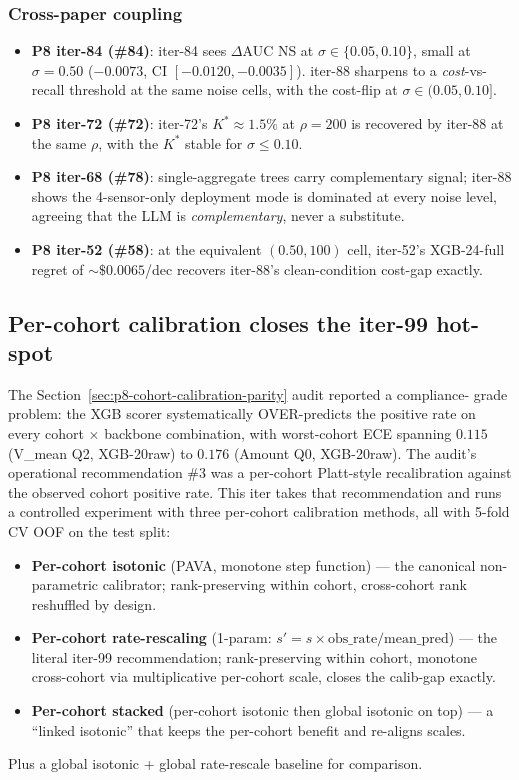 \documentclass{article}
\providecommand{\secref}[1]{Section~\ref{#1}}
\begin{document}
\subsubsection{Cross-paper coupling}
\begin{itemize}
\item \textbf{P8 iter-84 (\#84)}: iter-84 sees $\Delta$AUC NS at
      $\sigma \in \{0.05, 0.10\}$, small at $\sigma = 0.50$ ($-0.0073$,
      CI $[-0.0120, -0.0035]$). iter-88 sharpens to a
      \emph{cost}-vs-recall threshold at the same noise cells, with the
      cost-flip at $\sigma \in (0.05, 0.10]$.
\item \textbf{P8 iter-72 (\#72)}: iter-72's $K^* \approx 1.5\%$ at
      $\rho = 200$ is recovered by iter-88 at the same $\rho$, with the
      $K^*$ stable for $\sigma \le 0.10$.
\item \textbf{P8 iter-68 (\#78)}: single-aggregate trees carry
      complementary signal; iter-88 shows the 4-sensor-only deployment
      mode is dominated at every noise level, agreeing that the LLM is
      \emph{complementary}, never a substitute.
\item \textbf{P8 iter-52 (\#58)}: at the equivalent $(0.50, 100)$
      cell, iter-52's XGB-24-full regret of $\sim \$0.0065$/dec
      recovers iter-88's clean-condition cost-gap exactly.
\end{itemize}
 \subsection{Per-cohort calibration closes the iter-99 hot-spot}
\label{sec:p8-cohort-recalibration}

The \secref{sec:p8-cohort-calibration-parity} audit reported a compliance-
grade problem: the XGB scorer systematically OVER-predicts the positive rate
on every cohort $\times$ backbone combination, with worst-cohort ECE
spanning $0.115$ (V\_mean Q2, XGB-20raw) to $0.176$ (Amount Q0, XGB-20raw).
The audit's operational recommendation \#3 was a per-cohort Platt-style
recalibration against the observed cohort positive rate. This iter takes
that recommendation and runs a controlled experiment with three per-cohort
calibration methods, all with 5-fold CV OOF on the test split:

\begin{itemize}
\item \textbf{Per-cohort isotonic} (PAVA, monotone step function) --- the
      canonical non-parametric calibrator; rank-preserving within cohort,
      cross-cohort rank reshuffled by design.
\item \textbf{Per-cohort rate-rescaling} (1-param: $s' = s \times
      \mathrm{obs\_rate} / \mathrm{mean\_pred}$) --- the literal iter-99
      recommendation; rank-preserving within cohort, monotone cross-cohort
      via multiplicative per-cohort scale, closes the calib-gap exactly.
\item \textbf{Per-cohort stacked} (per-cohort isotonic then global isotonic
      on top) --- a ``linked isotonic'' that keeps the per-cohort benefit
      and re-aligns scales.
\end{itemize}
Plus a global isotonic + global rate-rescale baseline for comparison.
\end{document}
